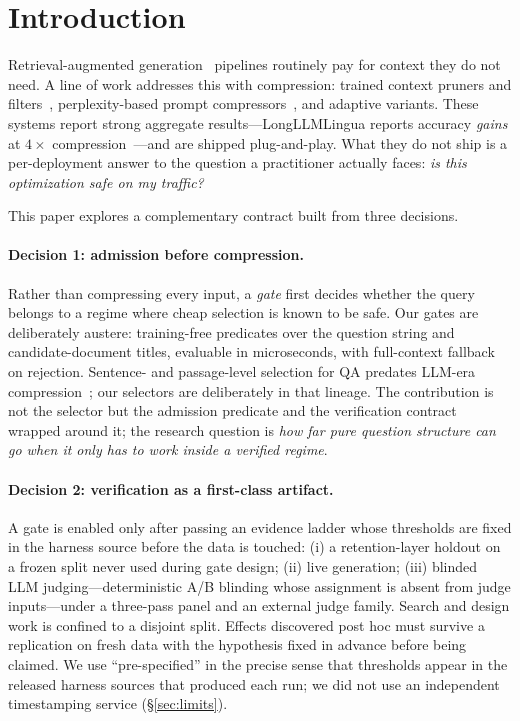 \documentclass[11pt]{article}
\begin{document}
\section{Introduction}

Retrieval-augmented generation~\citep{lewis2020rag,karpukhin2020dpr}
pipelines routinely pay for context they do
not need. A line of work addresses this with compression: trained context
pruners and filters~\citep{wang2023filco,xu2024recomp,chirkova2025provence,zhang2024adacomp},
perplexity-based prompt compressors~\citep{jiang2023llmlingua,jiang2024longllmlingua},
and adaptive variants. These systems report strong aggregate
results---LongLLMLingua reports accuracy \emph{gains} at $4\times$
compression~\citep{jiang2024longllmlingua}---and are shipped plug-and-play.
What they do not ship is a per-deployment answer to the question a
practitioner actually faces: \emph{is this optimization safe on my
traffic?}

This paper explores a complementary contract built from three decisions.

\paragraph{Decision 1: admission before compression.} Rather than
compressing every input, a \emph{gate} first decides whether the query
belongs to a regime where cheap selection is known to be safe. Our gates
are deliberately austere: training-free predicates over the question string
and candidate-document titles, evaluable in microseconds, with full-context
fallback on rejection. Sentence- and passage-level selection for QA
predates LLM-era compression~\citep{choi2017coarse,min2018efficient,nie2019revealing};
our selectors are deliberately in that lineage. The contribution is not the
selector but the admission predicate and the verification contract wrapped
around it; the research question is \emph{how far pure question structure
can go when it only has to work inside a verified regime}.

\paragraph{Decision 2: verification as a first-class artifact.} A gate is
enabled only after passing an evidence ladder whose thresholds are fixed in
the harness source before the data is touched: (i) a retention-layer
holdout on a frozen split never used during gate design; (ii) live
generation; (iii) blinded LLM judging---deterministic A/B blinding whose
assignment is absent from judge inputs---under a three-pass panel and an
external judge family. Search and design work is confined to a disjoint
split. Effects discovered post hoc must survive a replication on fresh
data with the hypothesis fixed in advance before being claimed. We use
``pre-specified'' in the precise sense that thresholds appear in the
released harness sources that produced each run; we did not use an
independent timestamping service (\S\ref{sec:limits}).
\end{document}
